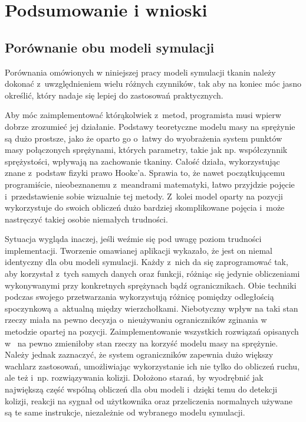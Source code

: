 \chapter{Podsumowanie i wnioski}
\label{t:wnioski}

	\section{Porównanie obu modeli symulacji}
	\label{t:wnioski:porownanie}
	
	
	Porównania omówionych w niniejszej pracy modeli symulacji tkanin należy dokonać z~uwzględnieniem wielu różnych czynników, tak aby na koniec móc jasno określić, który nadaje się lepiej do zastosowań praktycznych. 
	
	Aby móc zaimplementować którąkolwiek z~metod, programista musi wpierw dobrze zrozumieć jej działanie. Podstawy teoretyczne modelu masy na sprężynie są dużo prostsze, jako że oparto go o~łatwy do wyobrażenia system punktów masy połączonych sprężynami, których parametry, takie jak np. współczynnik sprężystości, wpływają na zachowanie tkaniny. Całość działa, wykorzystując znane z~podstaw fizyki prawo Hooke'a. Sprawia to, że nawet początkującemu programiście, nieobeznanemu z~meandrami matematyki, łatwo przyjdzie pojęcie i~przedstawienie sobie wizualnie tej metody. Z~kolei model oparty na pozycji wykorzystuje do swoich obliczeń dużo bardziej skomplikowane pojęcia i~może nastręczyć takiej osobie niemałych trudności.
	
	Sytuacja wygląda inaczej, jeśli weźmie się pod uwagę poziom trudności implementacji. Tworzenie omawianej aplikacji wykazało, że jest on niemal identyczny dla obu modeli symulacji. Każdy z~nich da się zaprogramować tak, aby korzystał z~tych samych danych oraz funkcji, różniąc się jedynie obliczeniami wykonywanymi przy konkretnych sprężynach bądź ogranicznikach. Obie techniki podczas swojego przetwarzania wykorzystują różnicę pomiędzy odległością spoczynkową a~aktualną między wierzchołkami. Niebotyczny wpływ na taki stan rzeczy miała na pewno decyzja o~nieużywaniu ograniczników zginania w metodzie opartej na pozycji. Zaimplementowanie wszystkich rozwiązań opisanych w~\cite{posbased} na pewno zmieniłoby stan rzeczy na korzyść modelu masy na sprężynie. Należy jednak zaznaczyć, że system ograniczników zapewnia dużo większy wachlarz zastosowań, umożliwiając wykorzystanie ich nie tylko do obliczeń ruchu, ale też i~np. rozwiązywania kolizji. Dołożono starań, by wyodrębnić jak największą część wspólną obliczeń dla obu modeli i~dzięki temu do detekcji kolizji, reakcji na sygnał od użytkownika oraz przeliczenia normalnych używane są te same instrukcje, niezależnie od wybranego modelu symulacji.
	
